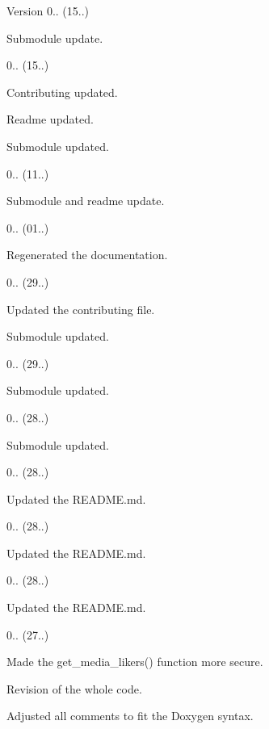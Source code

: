 \begin{DoxyVersion}{Version}
0.. (15..)
\begin{DoxyItemize}
\item Submodule update. 
\end{DoxyItemize}

0.. (15..)
\begin{DoxyItemize}
\item Contributing updated.
\item Readme updated.
\item Submodule updated. 
\end{DoxyItemize}

0.. (11..)
\begin{DoxyItemize}
\item Submodule and readme update. 
\end{DoxyItemize}

0.. (01..)
\begin{DoxyItemize}
\item Regenerated the documentation. 
\end{DoxyItemize}

0.. (29..)
\begin{DoxyItemize}
\item Updated the contributing file.
\item Submodule updated. 
\end{DoxyItemize}

0.. (29..)
\begin{DoxyItemize}
\item Submodule updated. 
\end{DoxyItemize}

0.. (28..)
\begin{DoxyItemize}
\item Submodule updated. 
\end{DoxyItemize}

0.. (28..)
\begin{DoxyItemize}
\item Updated the R\+E\+A\+D\+M\+E.\+md. 
\end{DoxyItemize}

0.. (28..)
\begin{DoxyItemize}
\item Updated the R\+E\+A\+D\+M\+E.\+md. 
\end{DoxyItemize}

0.. (28..)
\begin{DoxyItemize}
\item Updated the R\+E\+A\+D\+M\+E.\+md. 
\end{DoxyItemize}

0.. (27..)
\begin{DoxyItemize}
\item Made the get\+\_\+media\+\_\+likers() function more secure.
\item Revision of the whole code.
\item Adjusted all comments to fit the Doxygen syntax. 
\end{DoxyItemize}
\end{DoxyVersion}
